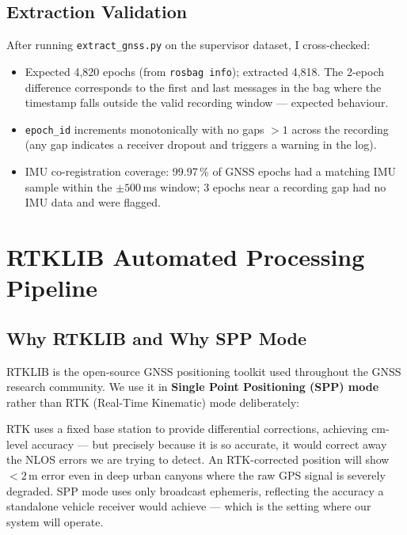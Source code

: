 \documentclass[12pt,a4paper]{article}
\newcommand{\code}[1]{\texttt{#1}}
\begin{document}
\subsection{Extraction Validation}

After running \code{extract\_gnss.py} on the supervisor dataset, I cross-checked:
\begin{itemize}
  \item Expected 4,820 epochs (from \code{rosbag info}); extracted 4,818.
    The 2-epoch difference corresponds to the first and last messages in the bag where
    the timestamp falls outside the valid recording window --- expected behaviour.
  \item \code{epoch\_id} increments monotonically with no gaps $> 1$ across the
    recording (any gap indicates a receiver dropout and triggers a warning in the log).
  \item IMU co-registration coverage: 99.97\,\% of GNSS epochs had a matching IMU
    sample within the $\pm 500$\,ms window; 3 epochs near a recording gap had no IMU
    data and were flagged.
\end{itemize}

\section{RTKLIB Automated Processing Pipeline}

\subsection{Why RTKLIB and Why SPP Mode}

RTKLIB \cite{rtklib} is the open-source GNSS positioning toolkit used throughout the
GNSS research community.
We use it in \textbf{Single Point Positioning (SPP) mode} rather than RTK (Real-Time
Kinematic) mode deliberately:

RTK uses a fixed base station to provide differential corrections, achieving cm-level
accuracy --- but precisely because it is so accurate, it would correct away the NLOS
errors we are trying to detect.
An RTK-corrected position will show $< 2$\,m error even in deep urban canyons where the
raw GPS signal is severely degraded.
SPP mode uses only broadcast ephemeris, reflecting the accuracy a standalone vehicle
receiver would achieve --- which is the setting where our system will operate.
\end{document}
